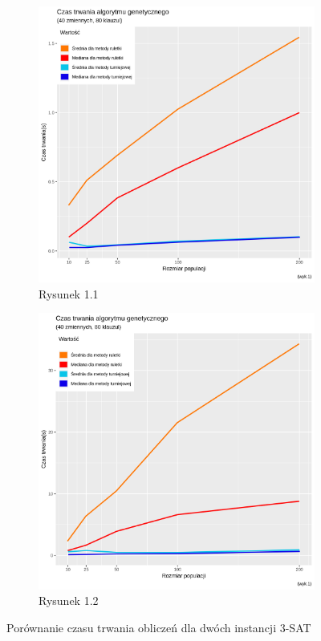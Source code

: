 \documentclass[twoside,twocolumn]{article}
\begin{document}
\begin{figure}[h!]
  \centering
  \begin{subfigure}[b]{\linewidth}
    \includegraphics[width=\linewidth]{40x80k.png}
    \caption{Rysunek 1.1}
  \end{subfigure}
  \begin{subfigure}[b]{\linewidth}
    \includegraphics[width=\linewidth]{50x100k.png}
    \caption{Rysunek 1.2}
  \end{subfigure}
  \caption{Porównanie czasu trwania obliczeń dla dwóch instancji 3-SAT}
  \label{fig:coffee}
\end{figure}
\end{document}
